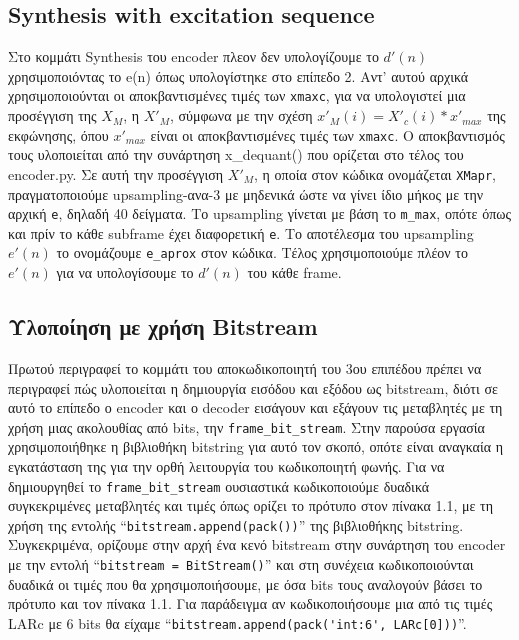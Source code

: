 \documentclass{article}
\begin{document}
\subsection{Synthesis with excitation sequence}

Στο κομμάτι Synthesis του encoder πλεον δεν υπολογίζουμε το $d'(n)$
χρησιμοποιόντας το e(n) όπως υπολογίστηκε στο επίπεδο 2. Αντ'
αυτού αρχικά χρησιμοποιούνται οι αποκβαντισμένες τιμές των
\verb|xmaxc|, για να υπολογιστεί μια προσέγγιση της $X_M$, η $X'_M$, σύμφωνα με
την σχέση $x'_M(i) = X'_c(i)*x'_{max}$ της εκφώνησης, όπου $x'_{max}$ είναι οι
αποκβαντισμένες τιμές των \verb|xmaxc|. Ο αποκβαντισμός τους υλοποιείται
από την συνάρτηση x\_dequant() που ορίζεται στο τέλος του encoder.py. Σε αυτή
την προσέγγιση $X'_M$, η οποία στον κώδικα ονομάζεται \verb|XMapr|, πραγματοποιούμε
upsampling-ανα-3 με μηδενικά ώστε να γίνει ίδιο μήκος με την αρχική
\verb|e|, δηλαδή 40 δείγματα. Το upsampling γίνεται με βάση το \verb|m_max|, οπότε όπως και
πρίν το κάθε subframe έχει διαφορετική \verb|e|. Το αποτέλεσμα του upsampling $e'(n)$
το ονομάζουμε \verb|e_aprox| στον κώδικα. Τέλος χρησιμοποιούμε πλέον το
$e'(n)$ για να υπολογίσουμε το $d'(n)$ του κάθε frame.

\subsection{Υλοποίηση με χρήση Bitstream}

Πρωτού περιγραφεί το κομμάτι του αποκωδικοποιητή του 3ου
επιπέδου πρέπει να περιγραφεί πώς υλοποιείται η δημιουργία
εισόδου και εξόδου ως bitstream, διότι σε αυτό το επίπεδο ο encoder
και ο decoder εισάγουν και εξάγουν τις μεταβλητές με τη χρήση
μιας ακολουθίας από bits, την \verb|frame_bit_stream|. Στην παρούσα εργασία
χρησιμοποιήθηκε η βιβλιοθήκη bitstring για αυτό τον σκοπό, οπότε
είναι αναγκαία η εγκατάσταση της για την ορθή λειτουργία του
κωδικοποιητή φωνής. Για
να δημιουργηθεί το \verb|frame_bit_stream| ουσιαστικά κωδικοποιούμε δυαδικά
συγκεκριμένες μεταβλητές και τιμές όπως ορίζει το πρότυπο στον
πίνακα 1.1, με τη χρήση της εντολής ``\verb|bitstream.append(pack())|'' της βιβλιοθήκης
bitstring. Συγκεκριμένα, ορίζουμε στην αρχή ένα κενό bitstream στην
συνάρτηση του encoder με την εντολή ``\verb|bitstream = BitStream()|'' 
και στη συνέχεια κωδικοποιούνται δυαδικά οι τιμές που θα χρησιμοποιήσουμε, με
όσα bits τους αναλογούν βάσει το πρότυπο και τον πίνακα 1.1. Για
παράδειγμα αν κωδικοποιήσουμε μια από τις τιμές LARc με 6 bits θα
είχαμε ``\verb|bitstream.append(pack('int:6', LARc[0]))|''.
\end{document}
